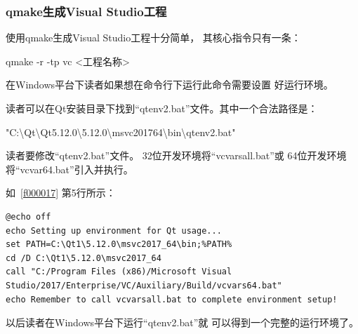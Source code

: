 
\subsubsection{
qmake生成Visual Studio工程
}\label{ss000910}

使用qmake生成Visual Studio工程十分简单，
其核心指令只有一条：

    \begin{center}
        \sourcefontone{}qmake -r -tp vc <工程名称>
    \end{center}

在Windows平台下读者如果想在命令行下运行此命令需要设置
好运行环境。


读者可以在Qt安装目录下找到“qtenv2.bat”文件。其中一个合法路径是：
\begin{littlelongworld}
"C:\textbackslash{}Qt\textbackslash{}Qt5.12.0\textbackslash{}5.12.0\textbackslash{}msvc2017\underline{\hspace{0.5em}}64\textbackslash{}bin\textbackslash{}qtenv2.bat"
\end{littlelongworld}

读者要修改“qtenv2.bat”文件。
32位开发环境将“vcvarsall.bat”或
64位开发环境将“vcvar64.bat”引入并执行。

如\lstlistingname\ \ref{f000017}
第5行所示：
\begin{lstlisting}[label=f000017,
caption=GoodLuck,
title=\lstlistingname\ \thelstlisting
]
@echo off
echo Setting up environment for Qt usage...
set PATH=C:\Qt1\5.12.0\msvc2017_64\bin;%PATH%
cd /D C:\Qt1\5.12.0\msvc2017_64
call "C:/Program Files (x86)/Microsoft Visual Studio/2017/Enterprise/VC/Auxiliary/Build/vcvars64.bat"
echo Remember to call vcvarsall.bat to complete environment setup!
\end{lstlisting}          %
以后读者在Windows平台下运行“qtenv2.bat”就
可以得到一个完整的运行环境了。








